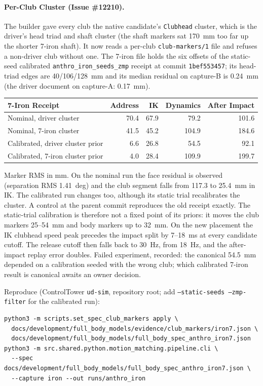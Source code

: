 \documentclass[11pt,a4paper]{article}
\begin{document}
\paragraph{Per-Club Cluster (Issue \#12210).}
The builder gave every club the native candidate's \texttt{Clubhead} cluster,
which is the driver's head triad and shaft cluster (the shaft markers sat
170~mm too far up the shorter 7-iron shaft). It now reads a per-club
\texttt{club-markers/1} file and refuses a non-driver club without one. The
7-iron file holds the six offsets of the static-seed calibrated
\texttt{anthro\_iron\_seeds\_zmp} receipt at commit \texttt{1bef553457}; its
head-triad edges are 40/106/128~mm and its median residual on capture-B is
0.24~mm (the driver document on capture-A: 0.17~mm).

\begin{center}
\begin{tabular}{lrrrr}
\hline
7-Iron Receipt & Address & IK & Dynamics & After Impact \\
\hline
Nominal, driver cluster & 70.4 & 67.9 & 79.2 & 101.6 \\
Nominal, 7-iron cluster & 41.5 & 45.2 & 104.9 & 184.6 \\
Calibrated, driver cluster prior & 6.6 & 26.8 & 54.5 & 92.1 \\
Calibrated, 7-iron cluster prior & 4.0 & 28.4 & 109.9 & 199.7 \\
\hline
\end{tabular}
\end{center}
Marker RMS in mm. On the nominal run the face residual is observed
(separation RMS 1.41~deg) and the club segment falls from 117.3 to
25.4~mm in IK. The calibrated run changes too, although its static trial
recalibrates the cluster. A control at the parent commit reproduces the old
receipt exactly. The static-trial calibration is therefore not a fixed point
of its priors: it moves the club markers 25--54~mm and body markers up to
32~mm. On the new placement the IK clubhead speed peak precedes the impact
split by 7--18~ms at every candidate cutoff. The release cutoff then falls
back to 30~Hz, from 18~Hz, and the after-impact replay error doubles.
Failed experiment, recorded: the canonical 54.5~mm depended on a
calibration seeded with the wrong club; which calibrated 7-iron result is
canonical awaits an owner decision.

Reproduce (ControlTower \texttt{ud-sim}, repository root; add
\texttt{--static-seeds --zmp-filter} for the calibrated run):
\begin{verbatim}
python3 -m scripts.set_spec_club_markers apply \
  docs/development/full_body_models/evidence/club_markers/iron7.json \
  docs/development/full_body_models/full_body_spec_anthro_iron7.json
python3 -m src.shared.python.motion_matching.pipeline.cli \
  --spec docs/development/full_body_models/full_body_spec_anthro_iron7.json \
  --capture iron --out runs/anthro_iron
\end{verbatim}
\end{document}
